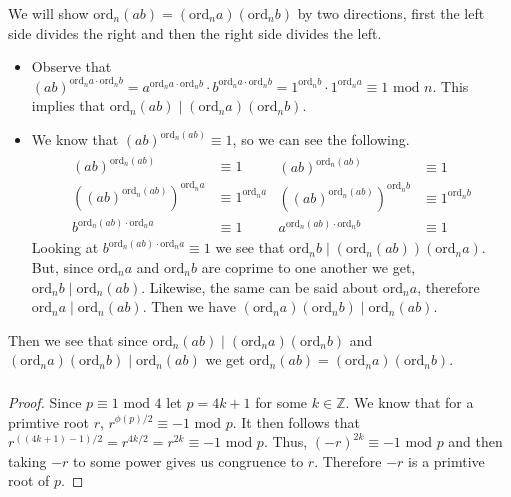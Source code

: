 \documentclass[class=article, crop=false]{standalone}
\def\integers{{\mathbb Z}}
\def\ord{{\text{ord}}}
\begin{document}
\subsubsection{}
We will show $\ord_n(ab)=(\ord_n a)(\ord_n b)$ by two directions, 
  first the left side divides the right and then the right side divides the left.
  \begin{itemize}
    \item Observe that 
    $(ab)^{\ord_n a \cdot \ord_n b} = a^{\ord_n a \cdot \ord_n b} \cdot b^{\ord_n a \cdot \ord_n b}
    = 1^{\ord_n b} \cdot 1^{\ord_n a} \equiv 1 \mbox{ mod } n$. This implies that $\ord_n (ab) \mid (\ord_n a)(\ord_n b)$.

    \item We know that $(ab)^{\ord_n (ab)}\equiv 1$, so we can see the following.
    \begin{align*}
      \begin{split}
        (ab)^{\ord_n (ab)} &\equiv 1 \\
        \left((ab)^{\ord_n (ab)}\right)^{\ord_n a} &\equiv 1^{\ord_n a} \\
        b^{\ord_n (ab) \cdot \ord_n a} &\equiv 1
      \end{split}
      \begin{split}
        (ab)^{\ord_n (ab)} &\equiv 1 \\
        \left((ab)^{\ord_n (ab)}\right)^{\ord_n b} &\equiv 1^{\ord_n b} \\
        a^{\ord_n (ab) \cdot \ord_n b} &\equiv 1
      \end{split}
    \end{align*}
    Looking at $b^{\ord_n (ab) \cdot \ord_n a} \equiv 1$ we see that 
    $\ord_n b \mid (\ord_n (ab))(\ord_n a)$. But, since $\ord_n a$ and $\ord_n b$ are coprime to
    one another we get,
    $\ord_n b \mid \ord_n (ab)$. Likewise, the same can be said about $\ord_n a$, therefore
    $\ord_n a \mid \ord_n (ab)$. Then we have $(\ord_n a)(\ord_n b)\mid \ord_n (ab)$.
  \end{itemize}
	Then we see that since $\ord_n (ab)\mid (\ord_n a)(\ord_n b)$ and $(\ord_n a)(\ord_n b)\mid \ord_n (ab)$
  we get $\ord_n(ab)=(\ord_n a)(\ord_n b)$.

\subsubsection{}
\begin{proof}
	Since $p\equiv 1\mbox{ mod } 4$ let $p=4k+1$ for some $k\in\integers$.
	We know that for a primtive root $r$, $r^{\phi(p)/2} \equiv -1\mbox{ mod }p$.
	It then follows that $r^{((4k+1)-1)/2} = r^{4k/2} = r^{2k} \equiv -1\mbox{ mod }p$.
	Thus, $(-r)^{2k} \equiv -1\mbox{ mod }p$ and then taking $-r$ to some power gives us
	congruence to $r$. Therefore $-r$ is a primtive root of $p$.
\end{proof}
\end{document}
